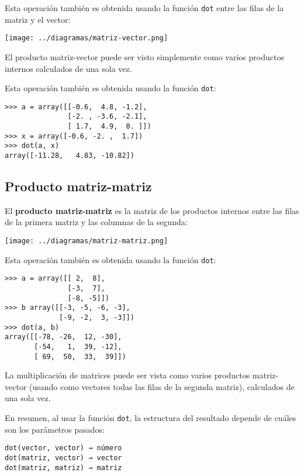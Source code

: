 Esta operación también es obtenida usando la función \lstinline!dot!
entre las filas de la matriz y el vector:

\texttt{[image: ../diagramas/matriz-vector.png]}

El producto matriz-vector puede ser visto simplemente como varios
productos internos calculados de una sola vez.

Esta operación también es obtenida usando la función \lstinline!dot!:

\begin{lstlisting}
>>> a = array([[-0.6,  4.8, -1.2],
               [-2. , -3.6, -2.1],
               [ 1.7,  4.9,  0. ]])
>>> x = array([-0.6, -2. ,  1.7])
>>> dot(a, x)
array([-11.28,   4.83, -10.82])
\end{lstlisting}

\subsection{Producto matriz-matriz}

El \textbf{producto matriz-matriz} es la matriz de los productos
internos entre las filas de la primera matriz y las columnas de la
segunda:

\texttt{[image: ../diagramas/matriz-matriz.png]}

Esta operación también es obtenida usando la función \lstinline!dot!:

\begin{lstlisting}
>>> a = array([[ 2,  8],
               [-3,  7],
               [-8, -5]])
>>> b array([[-3, -5, -6, -3],
             [-9, -2,  3, -3]])
>>> dot(a, b)
array([[-78, -26,  12, -30],
       [-54,   1,  39, -12],
       [ 69,  50,  33,  39]])
\end{lstlisting}

La multiplicación de matrices puede ser vista como varios productos
matriz-vector (usando como vectores todas las filas de la segunda
matriz), calculados de una sola vez.

En resumen, al usar la función \lstinline!dot!, la estructura del
resultado depende de cuáles son los parámetros pasados:

\begin{lstlisting}
dot(vector, vector) → número
dot(matriz, vector) → vector
dot(matriz, matriz) → matriz
\end{lstlisting}

